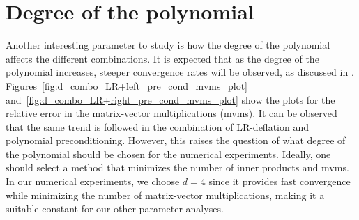 \section{Degree of the polynomial}
\label{sec:degree_of_the_polynomial}

Another interesting parameter to study is how the degree of the polynomial affects the different combinations. It is expected that as the degree of the polynomial increases, steeper convergence rates will be observed, as discussed in \cite{49}. Figures~\ref{fig:d_combo_LR+left_pre_cond_mvms_plot} and~\ref{fig:d_combo_LR+right_pre_cond_mvms_plot} show the plots for the relative error in the matrix-vector multiplications (mvms). It can be observed that the same trend is followed in the combination of LR-deflation and polynomial preconditioning. However, this raises the question of what degree of the polynomial should be chosen for the numerical experiments. Ideally, one should select a method that minimizes the number of inner products and mvms. In our numerical experiments, we choose $d = 4$ since it provides fast convergence while minimizing the number of matrix-vector multiplications, making it a suitable constant for our other parameter analyses.



